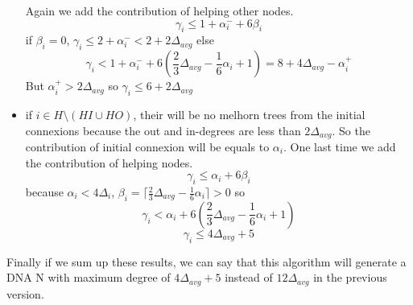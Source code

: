 \documentclass{article}
\begin{document}
\begin{itemize}
  Again we add the contribution of helping other nodes.
  $$\gamma_i \leq 1 + \alpha_i^- + 6\beta_i$$
  if $\beta_i = 0$, $\gamma_i \leq 2 + \alpha_i^- < 2 + 2\Delta_{avg}$
  else
  $$\gamma_i < 1 + \alpha_i^- + 6(\frac{2}{3}\Delta_{avg} - \frac{1}{6}\alpha_i + 1) = 8 + 4\Delta_{avg} - \alpha_i^+$$
  But $\alpha_i^+ > 2\Delta_{avg}$
  so $\gamma_i \leq 6 + 2\Delta_{avg}$
  \item if $i \in H \setminus (HI \cup HO)$, their will be no melhorn
  trees from the initial connexions because the out and in-degrees
  are less than $2\Delta_{avg}$. So the contribution of initial
  connexion will be equals to $\alpha_i$. One last time we add the
  contribution of helping nodes.
  $$\gamma_i \leq \alpha_i + 6\beta_i$$
  because $\alpha_i < 4\Delta_i$, $\beta_i = \lceil\frac{2}{3}\Delta_{avg}-\frac{1}{6}\alpha_i\rceil > 0$
  so $$\gamma_i < \alpha_i + 6(\frac{2}{3}\Delta_{avg}-\frac{1}{6}\alpha_i + 1)$$
  $$\gamma_i \leq 4\Delta_{avg} + 5$$
\end{itemize}
Finally if we sum up these results, we can say that this algorithm will
generate a DNA N with maximum degree of $4\Delta_{avg} + 5$ instead of
$12\Delta_{avg}$ in the previous version.
\end{document}
